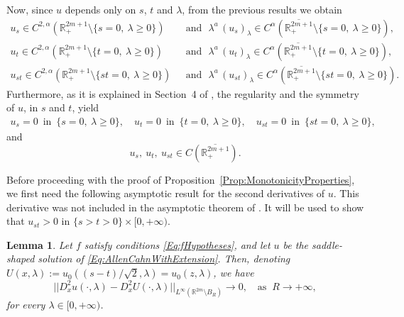 \documentclass[12pt,reqno]{amsart}
\newtheorem{lemma}[theorem]{Lemma}
\theoremstyle{definition}
\theoremstyle{remark}
\newcommand{\con}[1]{\mathbb{#1}}
\newcommand{\R}{\con{R}} %
\numberwithin{equation}{section}
\begin{document}
Now, since $u$ depends only on $s$, $t$ and $\lambda$, from the previous results we obtain
\begin{align*}
u_s \in C^{2,\alpha}(\R_+^{2m+1}\setminus\{s=0,\ \lambda \geq 0\}) \,\, &\text{ and }\,\, \lambda^a\,(u_s)_\lambda \in C^{\alpha}(\overline{\R_+^{2m+1}}\setminus\{s=0,\ \lambda \geq 0\}),\\
u_t \in C^{2,\alpha}(\R_+^{2m+1}\setminus\{t=0,\ \lambda \geq 0\}) \,\, &\text{ and }\,\, \lambda^a\,(u_t)_\lambda \in C^{\alpha}(\overline{\R_+^{2m+1}}\setminus\{t=0,\ \lambda \geq 0\}),\\
u_{st} \in C^{2,\alpha}(\R_+^{2m+1}\setminus\{st=0,\ \lambda \geq 0\}) \,\, &\text{ and }\,\, \lambda^a\,(u_{st})_\lambda \in C^{\alpha}(\overline{\R_+^{2m+1}}\setminus\{st=0,\ \lambda \geq 0\}).
\end{align*}
Furthermore, as it is explained in Section~4 of \cite{Cabre-Saddle}, the regularity and the symmetry of $u$, in $s$ and $t$, yield
\begin{align*}
u_s=0 \,\text{ in } \, \{s=0,\ \lambda \geq 0\}, \quad 
u_t=0 \,\text{ in } \, \{t=0,\ \lambda \geq 0\},  \quad
u_{st}=0 \,\text{ in } \, \{st=0,\ \lambda \geq 0\},
\end{align*}
and
$$ u_s, \ u_t,\ u_{st} \in C(\overline{\R^{2m+1}_+}).  $$


Before proceeding with the proof of Proposition~\ref{Prop:MonotonicityProperties}, we first need the following asymptotic result for the second derivatives of $u$. This derivative was not included in the asymptotic theorem of \cite{Cinti-Saddle, Cinti-Saddle2}. It will be used to show that $u_{st}>0$ in $\{s>t>0\}\times [0,+\infty)$.

\begin{lemma}
\label{Lemma:AsymptoticSecondDerivative}
Let $f$ satisfy conditions \eqref{Eq:fHypotheses}, and let $u$ be the saddle-shaped solution of \eqref{Eq:AllenCahnWithExtension}. Then, denoting $U(x,\lambda) := u_0((s - t)/\sqrt{2},\lambda) = u_0(z,\lambda)$, we have
$$ ||D^2_x u(\cdot,\lambda) - D^2_x U(\cdot,\lambda)||_{L^\infty(\R^{2m}\setminus B_R)} \to 0, \ \ \ \text{ as } \ R\to+\infty, $$
for every $\lambda \in [0,+\infty)$.
\end{lemma}
\end{document}
